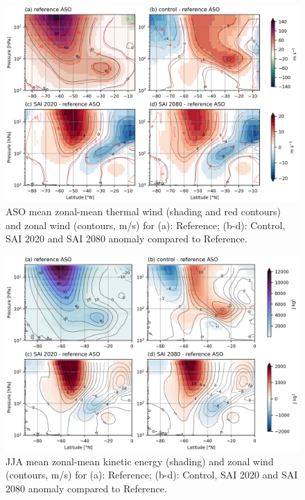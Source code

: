 \begin{figure}[H]
	\centering
	\includegraphics[width=0.95\linewidth]{images/PNJ_UT_U_zmdiff.png}
	\caption{ASO mean zonal-mean thermal wind (shading and red contours) and zonal wind (contours, m/s) for (a): Reference; (b-d): Control, SAI 2020 and SAI 2080 anomaly compared to Reference.}
	\label{fig:PNJ_UT_U_zmdiff}
\end{figure}

\begin{figure}[H]
	\centering
	\includegraphics[width=0.95\linewidth]{images/PNJ_KE_U_zmdiff.png}
	\caption{JJA mean zonal-mean kinetic energy (shading) and zonal wind (contours, m/s) for (a): Reference; (b-d): Control, SAI 2020 and SAI 2080 anomaly compared to Reference.}
	\label{fig:PNJ_KE_U_zmdiff}
\end{figure}


